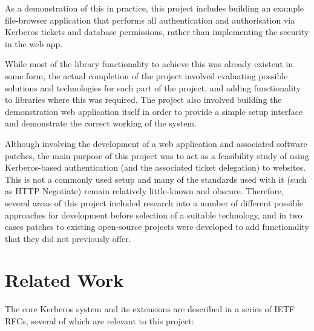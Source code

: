 \documentclass[12pt]{report}
\begin{document}
As a demonstration of this in practice, this project includes building an example file-browser application that performs all authentication and authorisation via Kerberos tickets and database permissions, rather than implementing the security in the web app.

While most of the library functionality to achieve this was already existent in some form, the actual completion of the project involved evaluating possible solutions and technologies for each part of the project, and adding functionality to libraries where this was required. The project also involved building the demonstration web application itself in order to provide a simple setup interface and demonstrate the correct working of the system.

Although involving the development of a web application and associated software patches, the main purpose of this project was to act as a feasibility study of using Kerberos-based authentication (and the associated ticket delegation) to websites. This is not a commonly used setup and many of the standards used with it (such as HTTP Negotiate) remain relatively little-known and obscure. Therefore, several areas of this project included research into a number of different possible approaches for development before selection of a suitable technology, and in two cases patches to existing open-source projects were developed to add functionality that they did not previously offer.

\section{Related Work}
The core Kerberos system and its extensions are described in a series of IETF RFCs, several of which are relevant to this project:
\end{document}
